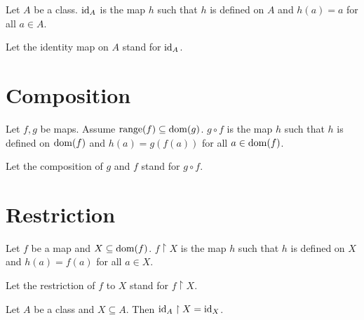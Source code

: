 \documentclass[10pt]{article}
\begin{document}
  \begin{forthel}
    \begin{definition}
      Let $A$ be a class.
      $\textrm{id}_{A}$ is the map $h$ such that $h$ is defined on $A$ and $h(a) = a$
      for all $a \in A$.
    \end{definition}

    Let the identity map on $A$ stand for $\textrm{id}_{A}$.
  \end{forthel}


  \section{Composition}

  \begin{forthel}
    \begin{definition}
      Let $f, g$ be maps.
      Assume $\textrm{range}(f) \subseteq \operatorname{dom}(g)$.
      $g \circ f$ is the map $h$ such that $h$ is defined on $\operatorname{dom}(f)$ and
      $h(a) = g(f(a))$ for all $a \in \operatorname{dom}(f)$.
    \end{definition}

    Let the composition of $g$ and $f$ stand for $g \circ f$.
  \end{forthel}


  \section{Restriction}

  \begin{forthel}
    \begin{definition}
      Let $f$ be a map and $X \subseteq \operatorname{dom}(f)$.
      $f \restriction X$ is the map $h$ such that $h$ is defined on $X$ and
      $h(a) = f(a)$ for all $a \in X$.
    \end{definition}

    Let the restriction of $f$ to $X$ stand for $f \restriction X$.
  \end{forthel}

  \begin{forthel}
    \begin{proposition}
      Let $A$ be a class and $X \subseteq A$.
      Then $\textrm{id}_{A} \restriction X = \textrm{id}_{X}$.
    \end{proposition}
  \end{forthel}
\end{document}
